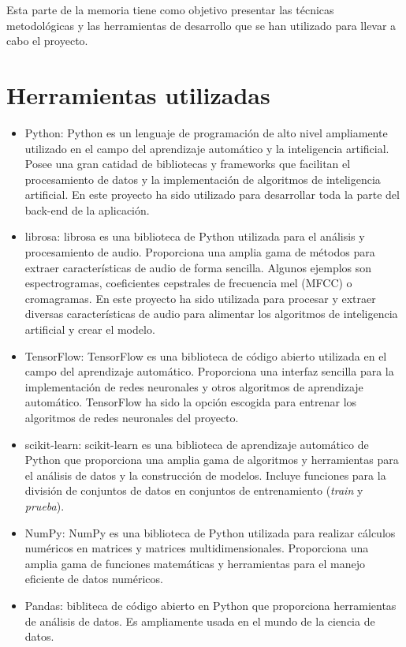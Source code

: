 
Esta parte de la memoria tiene como objetivo presentar las técnicas metodológicas y las herramientas de desarrollo que se han utilizado para llevar a cabo el proyecto.

\section{Herramientas utilizadas}
\begin{itemize}
\item Python: Python es un lenguaje de programación de alto nivel ampliamente utilizado en el campo del aprendizaje automático y la inteligencia artificial. Posee una gran catidad de bibliotecas y frameworks que facilitan el procesamiento de datos y la implementación de algoritmos de inteligencia artificial.
En este proyecto ha sido utilizado para desarrollar toda la parte del back-end de la aplicación. 

\item librosa: librosa es una biblioteca de Python utilizada para el análisis y procesamiento de audio. Proporciona una amplia gama de métodos para extraer características de audio de forma sencilla. Algunos ejemplos son espectrogramas, coeficientes cepstrales de frecuencia mel (MFCC) o cromagramas.
En este proyecto ha sido utilizada para procesar y extraer diversas características de audio para alimentar los algoritmos de inteligencia artificial y crear el modelo.

\item TensorFlow: TensorFlow es una biblioteca de código abierto utilizada en el campo del aprendizaje automático. Proporciona una interfaz sencilla para la implementación de redes neuronales y otros algoritmos de aprendizaje automático.
TensorFlow ha sido la opción escogida para entrenar los algoritmos de redes neuronales del proyecto.

\item scikit-learn: scikit-learn es una biblioteca de aprendizaje automático de Python que proporciona una amplia gama de algoritmos y herramientas para el análisis de datos y la construcción de modelos. Incluye funciones para la división de conjuntos de datos en conjuntos de entrenamiento (\textit{train} y \textit{prueba}).

\item NumPy: NumPy es una biblioteca de Python utilizada para realizar cálculos numéricos en matrices y matrices multidimensionales. Proporciona una amplia gama de funciones matemáticas y herramientas para el manejo eficiente de datos numéricos.

\item Pandas: bibliteca de código abierto en Python que proporciona herramientas de análisis de datos. Es ampliamente usada en el mundo de la ciencia de datos.
\end{itemize}


